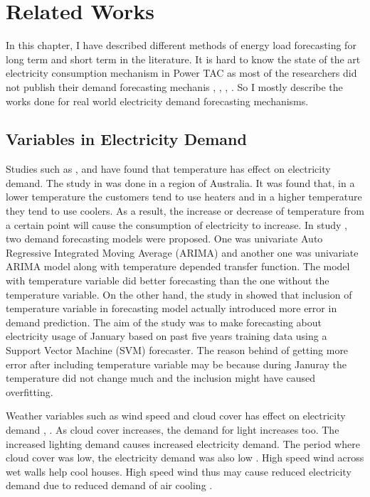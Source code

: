 
\chapter{Related Works}

In this chapter, I have described different methods of energy load forecasting for long term and short term in the literature. It is hard to know the state of the art electricity consumption mechanism in Power TAC as most of the researchers did not publish their demand forecasting mechanis \cite{liefers2014successful}, \cite{ozdemir2015winner}, \cite{serranofixing}, \cite{ozdemir2015agentude}. So I mostly describe the works done for real world electricity demand forecasting mechanisms.   

\section{Variables in Electricity Demand}

Studies such as \cite{hor2005analyzing}, \cite{hart2004weather} and \cite{cho1995customer} have found that temperature has effect on electricity demand. The study in \cite{hart2004weather} was done in a region of Australia.  It was found that,  in a lower temperature the customers tend to use heaters and in a higher temperature they tend to use coolers. As a result, the increase or decrease of temperature from a certain point will cause the consumption of electricity to increase. In study \cite{cho1995customer}, two demand forecasting models were proposed. One was univariate Auto Regressive Integrated Moving Average (ARIMA) and another one was univariate ARIMA model along with temperature depended transfer function. The model with temperature variable did better forecasting than the one without the temperature variable. On the other hand, the study in  \cite{chen2004load} showed that inclusion of temperature variable in forecasting model actually introduced more error in demand prediction. The aim of the study was to make forecasting about electricity usage of January based on past five years training data using a Support Vector Machine (SVM)  forecaster. The reason behind of getting more error after including temperature variable may be because during Januray the temperature did not change much and the inclusion might have caused overfitting. 

Weather variables such as  wind speed and cloud cover has effect on electricity demand \cite{hor2005analyzing}, \cite{rudenauer2004energy}. As cloud cover increases, the demand for light increases too. The increased lighting demand causes increased electricity demand. The period where cloud cover was low, the electricity demand was also low \cite{hor2005analyzing}. High speed wind across wet walls help cool houses. High speed wind thus may cause reduced electricity demand due to reduced demand of air cooling \cite{rudenauer2004energy}. 


